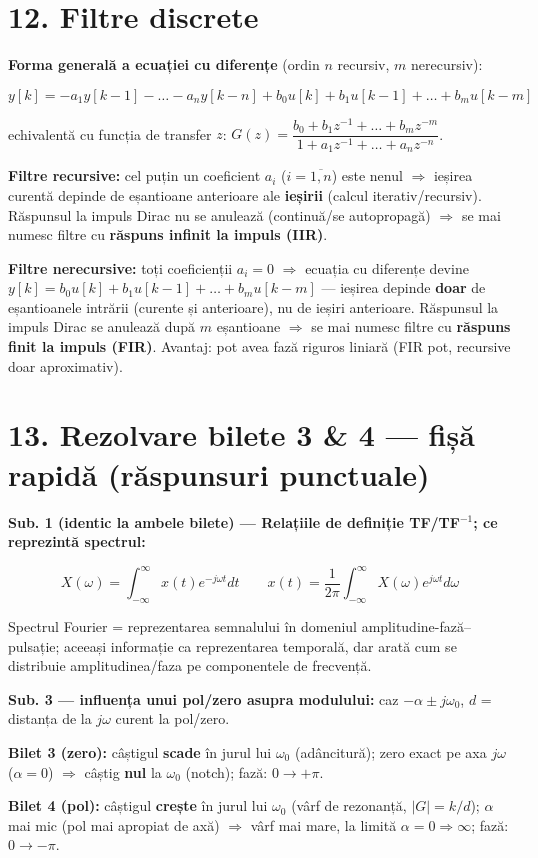 \documentclass[10pt,a4paper]{article}
\begin{document}
\section*{12. Filtre discrete}
\textbf{Forma generală a ecuației cu diferențe} (ordin $n$ recursiv, $m$ nerecursiv):
\begin{keyeq}\color{red!65!black}
$$y[k]=-a_1y[k-1]-\dots-a_ny[k-n]+b_0u[k]+b_1u[k-1]+\dots+b_mu[k-m]$$
\end{keyeq}
echivalentă cu funcția de transfer $z$: $G(z)=\dfrac{b_0+b_1z^{-1}+\dots+b_mz^{-m}}{1+a_1z^{-1}+\dots+a_nz^{-n}}$.

\textbf{Filtre recursive:} cel puțin un coeficient $a_i$ ($i=\overline{1,n}$) este nenul $\Rightarrow$ ieșirea curentă depinde de eșantioane anterioare ale \textbf{ieșirii} (calcul iterativ/recursiv). Răspunsul la impuls Dirac nu se anulează (continuă/se autopropagă) $\Rightarrow$ se mai numesc filtre cu \textbf{răspuns infinit la impuls (IIR)}.

\textbf{Filtre nerecursive:} toți coeficienții $a_i=0$ $\Rightarrow$ ecuația cu diferențe devine $y[k]=b_0u[k]+b_1u[k-1]+\dots+b_mu[k-m]$ — ieșirea depinde \textbf{doar} de eșantioanele intrării (curente și anterioare), nu de ieșiri anterioare. Răspunsul la impuls Dirac se anulează după $m$ eșantioane $\Rightarrow$ se mai numesc filtre cu \textbf{răspuns finit la impuls (FIR)}. Avantaj: pot avea fază riguros liniară (FIR pot, recursive doar aproximativ).

\section*{13. Rezolvare bilete 3 \& 4 — fișă rapidă (răspunsuri punctuale)}

\textbf{Sub. 1 (identic la ambele bilete) — Relațiile de definiție TF/TF$^{-1}$; ce reprezintă spectrul:}
\begin{keyeq}\color{red!65!black}
$$X(\omega)=\int_{-\infty}^{\infty}x(t)e^{-j\omega t}dt \qquad x(t)=\frac{1}{2\pi}\int_{-\infty}^{\infty}X(\omega)e^{j\omega t}d\omega$$
\end{keyeq}
Spectrul Fourier = reprezentarea semnalului în domeniul amplitudine-fază–pulsație; aceeași informație ca reprezentarea temporală, dar arată cum se distribuie amplitudinea/faza pe componentele de frecvență.

\textbf{Sub. 3 — influența unui pol/zero asupra modulului:} caz $-\alpha\pm j\omega_0$, $d$ = distanța de la $j\omega$ curent la pol/zero.
\begin{keyeq}\color{red!65!black}
\textbf{Bilet 3 (zero):} câștigul \textbf{scade} în jurul lui $\omega_0$ (adâncitură); zero exact pe axa $j\omega$ ($\alpha=0$) $\Rightarrow$ câștig \textbf{nul} la $\omega_0$ (notch); fază: $0\to+\pi$.

\textbf{Bilet 4 (pol):} câștigul \textbf{crește} în jurul lui $\omega_0$ (vârf de rezonanță, $|G|=k/d$); $\alpha$ mai mic (pol mai apropiat de axă) $\Rightarrow$ vârf mai mare, la limită $\alpha=0\Rightarrow\infty$; fază: $0\to-\pi$.
\end{keyeq}
\end{document}
